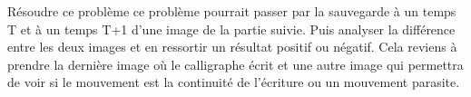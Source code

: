 Résoudre ce problème ce probl\`eme pourrait passer par la sauvegarde \`a un temps T et \`a un temps T+1 d'une image de la partie suivie. Puis analyser la diff\'erence entre les deux images et en ressortir un r\'esultat positif ou n\'egatif. Cela reviens \`a prendre la derni\`ere image o\`u le calligraphe \'ecrit et une autre image qui permettra de voir si le mouvement est la continuit\'e de l'\'ecriture ou un mouvement parasite.